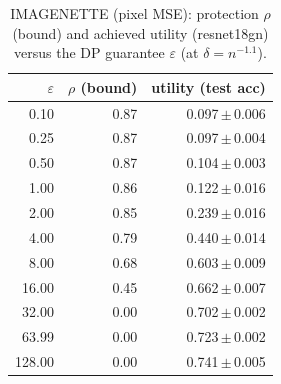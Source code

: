 \begin{table}[t]
  \centering
  \caption{IMAGENETTE (pixel MSE): protection $\rho$ (bound) and achieved utility (resnet18gn) versus the DP guarantee $\varepsilon$ (at $\delta=n^{-1.1}$).}
  \label{tab:util_imagenette_mse}
  \begin{tabular}{r r r}
    \toprule
    $\varepsilon$ & $\rho$ (bound) & utility (test acc) \\
    \midrule
    0.10 & 0.87 & 0.097\,$\pm$\,0.006 \\
    0.25 & 0.87 & 0.097\,$\pm$\,0.004 \\
    0.50 & 0.87 & 0.104\,$\pm$\,0.003 \\
    1.00 & 0.86 & 0.122\,$\pm$\,0.016 \\
    2.00 & 0.85 & 0.239\,$\pm$\,0.016 \\
    4.00 & 0.79 & 0.440\,$\pm$\,0.014 \\
    8.00 & 0.68 & 0.603\,$\pm$\,0.009 \\
    16.00 & 0.45 & 0.662\,$\pm$\,0.007 \\
    32.00 & 0.00 & 0.702\,$\pm$\,0.002 \\
    63.99 & 0.00 & 0.723\,$\pm$\,0.002 \\
    128.00 & 0.00 & 0.741\,$\pm$\,0.005 \\
    \bottomrule
  \end{tabular}
\end{table}
